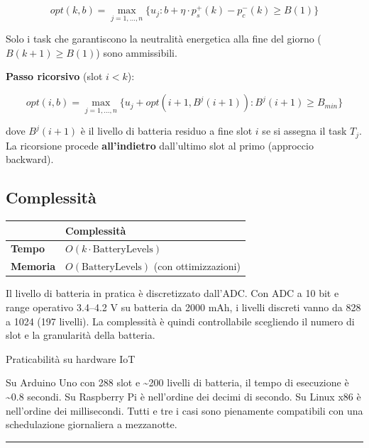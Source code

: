 \documentclass[
  italian,
  openany]{book}
\newcounter{none} %
\begin{document}
\[
opt(k, b) = \max_{j=1,\ldots,n} \{u_j : b + \eta \cdot p_s^+(k) - p_c^-(k) \geq B(1)\}
\]

Solo i task che garantiscono la neutralità energetica alla fine del
giorno (\(B(k+1) \geq B(1)\)) sono ammissibili.

\textbf{Passo ricorsivo} (slot \(i < k\)):

\[
opt(i, b) = \max_{j=1,\ldots,n} \{u_j + opt(i+1, B^j(i+1)) : B^j(i+1) \geq B_{min}\}
\]

dove \(B^j(i+1)\) è il livello di batteria residuo a fine slot \(i\) se
si assegna il task \(T_j\). La ricorsione procede \textbf{all'indietro}
dall'ultimo slot al primo (approccio backward).

\subsection{Complessità}\label{complessituxe0}

{\def\LTcaptype{none} %
\begin{longtable}[]{@{}ll@{}}
\toprule\noalign{}
& Complessità \\
\midrule\noalign{}
\endhead
\bottomrule\noalign{}
\endlastfoot
\textbf{Tempo} & \(O(k \cdot \text{BatteryLevels})\) \\
\textbf{Memoria} & \(O(\text{BatteryLevels})\) (con ottimizzazioni) \\
\end{longtable}
}

Il livello di batteria in pratica è discretizzato dall'ADC. Con ADC a 10
bit e range operativo 3.4--4.2 V su batteria da 2000 mAh, i livelli
discreti vanno da 828 a 1024 (197 livelli). La complessità è quindi
controllabile scegliendo il numero di slot e la granularità della
batteria.

\begin{calloutnote}{Praticabilità su hardware IoT}

Su Arduino Uno con 288 slot e \textasciitilde200 livelli di batteria, il
tempo di esecuzione è \textasciitilde0.8 secondi. Su Raspberry Pi è
nell'ordine dei decimi di secondo. Su Linux x86 è nell'ordine dei
millisecondi. Tutti e tre i casi sono pienamente compatibili con una
schedulazione giornaliera a mezzanotte.

\end{calloutnote}

\begin{center}\rule{0.5\linewidth}{0.5pt}\end{center}
\end{document}
